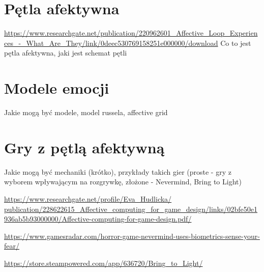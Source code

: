 \section{Pętla afektywna}
\url{https://www.researchgate.net/publication/220962601_Affective_Loop_Experiences_-_What_Are_They/link/0deec530769158251e000000/download}
Co to jest pętla afektywna, jaki jest schemat pętli

\section{Modele emocji}
Jakie mogą być modele, model russela, affective grid



\section{Gry z pętlą afektywną}
Jakie mogą być mechaniki (krótko), przykłady takich gier (proste - gry z wyborem wpływającym na rozgrywkę, złożone - Nevermind, Bring to Light)

\url{https://www.researchgate.net/profile/Eva_Hudlicka/ publication/228622615_Affective_computing_for_game_design/links/02bfe50e1936ab5b93000000/Affective-computing-for-game-design.pdf/}

\url{https://www.gamesradar.com/horror-game-nevermind-uses-biometrics-sense-your-fear/}

\url{https://store.steampowered.com/app/636720/Bring_to_Light/}


